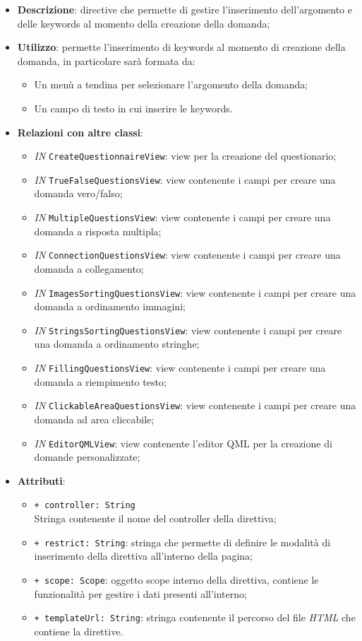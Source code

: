 \begin{itemize}
	\item \textbf{Descrizione}: directive che permette di gestire l'inserimento dell'argomento e delle keywords al momento della creazione della domanda;
	\item \textbf{Utilizzo}: permette l'inserimento di keywords al momento di creazione della domanda, in particolare sarà formata da:
	\begin{itemize}
		\item Un menù a tendina per selezionare l'argomento della domanda;
		\item Un campo di testo in cui inserire le keywords.
	\end{itemize}
	\item \textbf{Relazioni con altre classi}:
	\begin{itemize}
		\item \textit{IN} \texttt{CreateQuestionnaireView}: view per la creazione del questionario; 
		\item \textit{IN} \texttt{TrueFalseQuestionsView}: view contenente i campi per creare una domanda vero/falso; 
		\item \textit{IN} \texttt{MultipleQuestionsView}: view contenente i campi per creare una domanda a risposta multipla;
		\item \textit{IN} \texttt{ConnectionQuestionsView}: view contenente i campi per creare una domanda a collegamento;
		\item \textit{IN} \texttt{ImagesSortingQuestionsView}: view contenente i campi per creare una domanda a ordinamento immagini;
		\item \textit{IN} \texttt{StringsSortingQuestionsView}: view contenente i campi per creare una domanda a ordinamento stringhe;
		\item \textit{IN} \texttt{FillingQuestionsView}: view contenente i campi per creare una domanda a riempimento testo;
		\item \textit{IN} \texttt{ClickableAreaQuestionsView}: view contenente i campi per creare una domanda ad area cliccabile;
		\item \textit{IN} \texttt{EditorQMLView}: view contenente l'editor QML per la creazione di domande personalizzate;
	\end{itemize}
	\item \textbf{Attributi}:
	\begin{itemize}
		\item \texttt{+ controller: String} \\ Stringa contenente il nome del controller della direttiva;
		\item \texttt{+ restrict: String}: stringa che permette di definire le modalità di inserimento della direttiva all'interno della pagina;
		\item \texttt{+ scope: Scope}: oggetto scope interno della direttiva, contiene le funzionalità per gestire i dati presenti all'interno;
		\item \texttt{+ templateUrl: String}: stringa contenente il percorso del file \textit{HTML} che contiene la direttive.
	\end{itemize}
\end{itemize}

